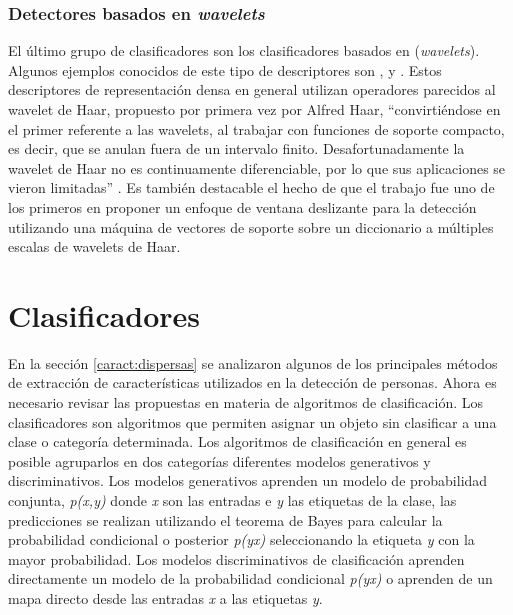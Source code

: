 \subsubsection{Detectores basados en \textit{wavelets}}

El último grupo de clasificadores son los clasificadores basados en (\textit{wavelets}). Algunos ejemplos conocidos de este tipo de descriptores son \cite{Papageorgiou2000}, \cite{mohan2001} y \cite{viola2001}. Estos descriptores de representación densa en general utilizan operadores parecidos al wavelet de Haar,  propuesto por primera vez por Alfred Haar, ``convirtiéndose en el primer referente a las wavelets, al trabajar con funciones de soporte compacto, es decir, que se anulan fuera de un intervalo finito. Desafortunadamente la wavelet de Haar no es continuamente diferenciable, por lo que sus aplicaciones se vieron limitadas'' \citep{FernandezSarria2007a}. Es también destacable el hecho de que el trabajo \cite{Papageorgiou2000} fue uno de los primeros en proponer un enfoque de ventana deslizante para la detección utilizando una máquina de vectores de soporte sobre un diccionario a múltiples escalas de wavelets de Haar.

\section{Clasificadores}
\label{preliminares:clasif}

En la sección \ref{caract:dispersas} se analizaron algunos de los principales métodos de extracción de características utilizados en la detección de personas. Ahora es necesario revisar las propuestas en materia de algoritmos de clasificación. Los clasificadores son algoritmos que permiten asignar un objeto sin clasificar a una clase o categoría determinada. Los algoritmos de clasificación en general es posible agruparlos en dos categorías diferentes \citep{ng2002} modelos generativos y discriminativos. Los modelos generativos aprenden un modelo de probabilidad conjunta, \textit{p(x,y)} donde \textit{x} son las entradas e \textit{y} las etiquetas de la clase, las predicciones se realizan utilizando el teorema de Bayes para calcular la probabilidad condicional o posterior \textit{p(y\textbar x)} seleccionando la etiqueta \textit{y} con la mayor probabilidad. Los modelos discriminativos de clasificación aprenden directamente un modelo de la probabilidad condicional \textit{p(y\textbar x)} o aprenden de un mapa directo desde las entradas \textit{x} a las etiquetas \textit{y}.

